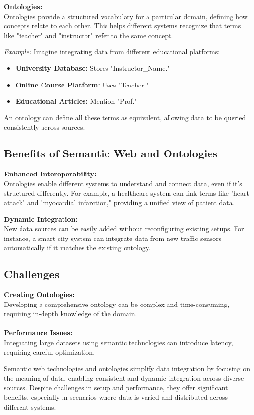 \documentclass[12pt]{article}
\begin{document}
\textbf{Ontologies:} \\
Ontologies provide a structured vocabulary for a particular domain, defining how concepts relate to each other. This helps different systems recognize that terms like "teacher" and "instructor" refer to the same concept.

\textit{Example:} Imagine integrating data from different educational platforms:
\begin{itemize}
    \item \textbf{University Database:} Stores "Instructor\_Name."
    \item \textbf{Online Course Platform:} Uses "Teacher."
    \item \textbf{Educational Articles:} Mention "Prof."
\end{itemize}

An ontology can define all these terms as equivalent, allowing data to be queried consistently across sources.

\subsection{Benefits of Semantic Web and Ontologies}
\textbf{Enhanced Interoperability:} \\
Ontologies enable different systems to understand and connect data, even if it's structured differently. For example, a healthcare system can link terms like "heart attack" and "myocardial infarction," providing a unified view of patient data.

\textbf{Dynamic Integration:} \\
New data sources can be easily added without reconfiguring existing setups. For instance, a smart city system can integrate data from new traffic sensors automatically if it matches the existing ontology.

\subsection{Challenges}
\textbf{Creating Ontologies:} \\
Developing a comprehensive ontology can be complex and time-consuming, requiring in-depth knowledge of the domain.
\\ \\
\textbf{Performance Issues:} \\
Integrating large datasets using semantic technologies can introduce latency, requiring careful optimization.

Semantic web technologies and ontologies simplify data integration by focusing on the meaning of data, enabling consistent and dynamic integration across diverse sources. Despite challenges in setup and performance, they offer significant benefits, especially in scenarios where data is varied and distributed across different systems.
\end{document}
